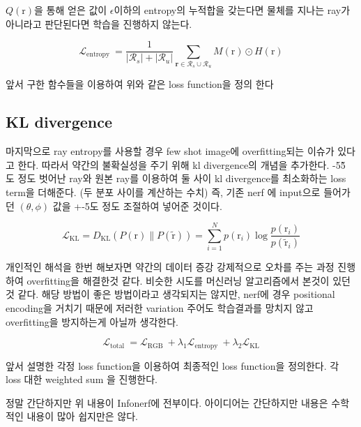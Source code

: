\documentclass{vipweekly}
\begin{document}
$Q(\mathrm{r})$을 통해 얻은 값이 $\epsilon$이하의 entropy의 누적합을 갖는다면 
물체를 지나는 ray가 아니라고 판단된다면 학습을 진행하지 않는다.

\begin{equation}
    \mathcal{L}_{\text {entropy }}=\frac{1}{\left|\mathcal{R}_s\right|+\left|\mathcal{R}_u\right|} \sum_{\mathbf{r} \in \mathcal{R}_s \cup \mathcal{R}_u} M(\mathrm{r}) \odot H(\mathrm{r})
\end{equation}

앞서 구한 함수들을 이용하여 위와 같은 loss function을 정의 한다

\subsection{KL divergence} 

마지막으로 ray entropy를 사용할 경우 few shot image에 overfitting되는 이슈가 있다고 한다.
따라서 약간의 불확실성을 주기 위해 kl divergence의 개념을 추가한다.
-5\~5 도 정도 벗어난 ray와 원본 ray를 이용하여 둘 사이 kl divergence를 최소화하는 loss term을 더해준다.
(두 분포 사이를 계산하는 수치)
즉, 기존 nerf 에 input으로 들어가던 $(\theta,\phi)$ 값을 +-5도 정도 조절하여 넣어준 것이다.

\begin{equation}
    \mathcal{L}_{\mathrm{KL}}=D_{\mathrm{KL}}(P(\mathrm{r}) \| P(\tilde{\mathrm{r}}))=\sum_{i=1}^N p\left(\mathrm{r}_i\right) \log \frac{p\left(\mathrm{r}_i\right)}{p\left(\tilde{\mathrm{r}}_i\right)}
\end{equation}

개인적인 해석을 한번 해보자면 약간의 데이터 증강 강제적으로 오차를 주는 과정 진행하여
overfitting을 해결한것 같다. 
비슷한 시도를 머신러닝 알고리즘에서 본것이 있던것 같다. 
해당 방법이 좋은 방법이라고 생각되지는 않지만,
nerf에 경우 positional encoding을 거치기 때문에 저러한 variation 주어도 학습결과를
망치지 않고 overfitting을 방지하는게 아닐까 생각한다.

\begin{equation}
    \mathcal{L}_{\text {total }}=\mathcal{L}_{\text {RGB }}+\lambda_1 \mathcal{L}_{\text {entropy }}+\lambda_2 \mathcal{L}_{\mathrm{KL}}
\end{equation}

앞서 설명한 각정 loss function을 이용하여 최종적인 loss function을 정의한다.
각 loss 대한 weighted sum 을 진행한다. 


정말 간단하지만 위 내용이 Infonerf에 전부이다. 아이디어는 간단하지만 내용은 수학적인 내용이 많아 쉽지만은 않다.
\end{document}

